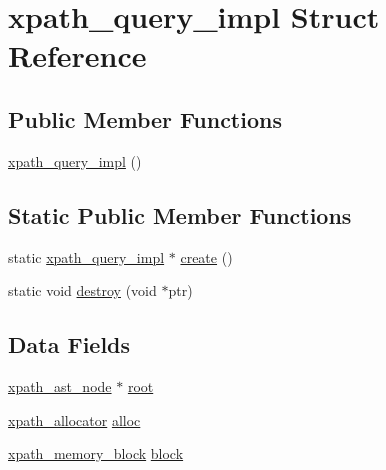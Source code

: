 \hypertarget{structxpath__query__impl}{
\section{xpath\_\-query\_\-impl Struct Reference}
\label{structxpath__query__impl}
}
\subsection*{Public Member Functions}
\begin{DoxyCompactItemize}
\item 
\hyperlink{structxpath__query__impl_a57ef8fcfa3f46e6c395edb00328e9a0e}{xpath\_\-query\_\-impl} ()
\end{DoxyCompactItemize}
\subsection*{Static Public Member Functions}
\begin{DoxyCompactItemize}
\item 
static \hyperlink{structxpath__query__impl}{xpath\_\-query\_\-impl} $\ast$ \hyperlink{structxpath__query__impl_afcf45bb9a20a4117b1e963d83277aa7f}{create} ()
\item 
static void \hyperlink{structxpath__query__impl_a9b7194b1356cca3f3b62f4cdb8d8960f}{destroy} (void $\ast$ptr)
\end{DoxyCompactItemize}
\subsection*{Data Fields}
\begin{DoxyCompactItemize}
\item 
\hyperlink{classxpath__ast__node}{xpath\_\-ast\_\-node} $\ast$ \hyperlink{structxpath__query__impl_ad25499e0c8391005e3a1a60633d631fe}{root}
\item 
\hyperlink{classxpath__allocator}{xpath\_\-allocator} \hyperlink{structxpath__query__impl_ae568b8642d48e729f2ccc2a50467c847}{alloc}
\item 
\hyperlink{structxpath__memory__block}{xpath\_\-memory\_\-block} \hyperlink{structxpath__query__impl_a3a8af3ceed6a504567656ec6d1b62641}{block}
\end{DoxyCompactItemize}


